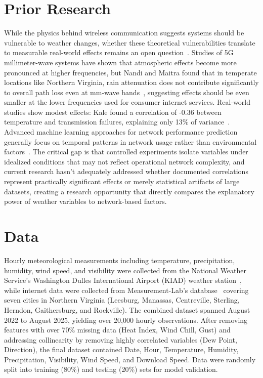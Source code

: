 \documentclass[10pt,final,journal,compsoc,letterpaper,twocolumn]{IEEEtran}
\begin{document}
\section{Prior Research}

While the physics behind wireless communication suggests systems should be vulnerable to weather changes, whether these theoretical vulnerabilities translate to measurable real-world effects remains an open question~\cite{tse2005fundamentals}. Studies of 5G millimeter-wave systems have shown that atmospheric effects become more pronounced at higher frequencies, but Nandi and Maitra found that in temperate locations like Northern Virginia, rain attenuation does not contribute significantly to overall path loss even at mm-wave bands~\cite{nandi2018rain}, suggesting effects should be even smaller at the lower frequencies used for consumer internet services. Real-world studies show modest effects: Kale found a correlation of -0.36 between temperature and transmission failures, explaining only 13\% of variance~\cite{kale2021impact}. Advanced machine learning approaches for network performance prediction generally focus on temporal patterns in network usage rather than environmental factors~\cite{nayak2021_5gtraffic, SU2024104359}. The critical gap is that controlled experiments isolate variables under idealized conditions that may not reflect operational network complexity, and current research hasn't adequately addressed whether documented correlations represent practically significant effects or merely statistical artifacts of large datasets, creating a research opportunity that directly compares the explanatory power of weather variables to network-based factors.

\section{Data}

Hourly meteorological measurements including temperature, precipitation, humidity, wind speed, and visibility were collected from the National Weather Service's Washington Dulles International Airport (KIAD) weather station~\cite{nws2024timeseries}, while internet data were collected from Measurement-Lab's database~\cite{mlab2025data} covering seven cities in Northern Virginia (Leesburg, Manassas, Centreville, Sterling, Herndon, Gaithersburg, and Rockville). The combined dataset spanned August 2022 to August 2025, yielding over 20,000 hourly observations. After removing features with over 70\% missing data (Heat Index, Wind Chill, Gust) and addressing collinearity by removing highly correlated variables (Dew Point, Direction), the final dataset contained Date, Hour, Temperature, Humidity, Precipitation, Visibility, Wind Speed, and Download Speed. Data were randomly split into training (80\%) and testing (20\%) sets for model validation.
\end{document}
